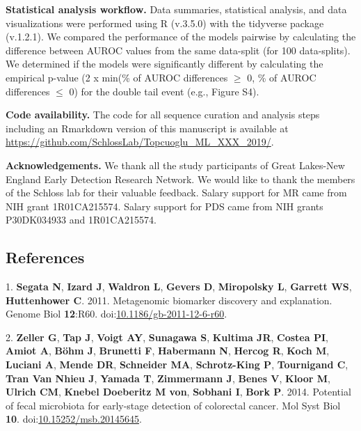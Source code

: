 \documentclass[11pt,]{article}
\begin{document}
\textbf{Statistical analysis workflow.} Data summaries, statistical
analysis, and data visualizations were performed using R (v.3.5.0) with
the tidyverse package (v.1.2.1). We compared the performance of the
models pairwise by calculating the difference between AUROC values from
the same data-split (for 100 data-splits). We determined if the models
were significantly different by calculating the empirical p-value (2 x
min(\% of AUROC differences \(\geq\) 0, \% of AUROC differences \(\leq\)
0) for the double tail event (e.g., Figure S4).

\textbf{Code availability.} The code for all sequence curation and
analysis steps including an Rmarkdown version of this manuscript is
available at \url{https://github.com/SchlossLab/Topcuoglu_ML_XXX_2019/}.

\textbf{Acknowledgements.} We thank all the study participants of Great
Lakes-New England Early Detection Research Network. We would like to
thank the members of the Schloss lab for their valuable feedback. Salary
support for MR came from NIH grant 1R01CA215574. Salary support for PDS
came from NIH grants P30DK034933 and 1R01CA215574.

\newpage

\subsection{References}\label{references}

\hypertarget{refs}{}
\hypertarget{ref-segata_metagenomic_2011}{}
1. \textbf{Segata N}, \textbf{Izard J}, \textbf{Waldron L},
\textbf{Gevers D}, \textbf{Miropolsky L}, \textbf{Garrett WS},
\textbf{Huttenhower C}. 2011. Metagenomic biomarker discovery and
explanation. Genome Biol \textbf{12}:R60.
doi:\href{https://doi.org/10.1186/gb-2011-12-6-r60}{10.1186/gb-2011-12-6-r60}.

\hypertarget{ref-zeller_potential_2014}{}
2. \textbf{Zeller G}, \textbf{Tap J}, \textbf{Voigt AY},
\textbf{Sunagawa S}, \textbf{Kultima JR}, \textbf{Costea PI},
\textbf{Amiot A}, \textbf{Böhm J}, \textbf{Brunetti F},
\textbf{Habermann N}, \textbf{Hercog R}, \textbf{Koch M},
\textbf{Luciani A}, \textbf{Mende DR}, \textbf{Schneider MA},
\textbf{Schrotz-King P}, \textbf{Tournigand C}, \textbf{Tran Van Nhieu
J}, \textbf{Yamada T}, \textbf{Zimmermann J}, \textbf{Benes V},
\textbf{Kloor M}, \textbf{Ulrich CM}, \textbf{Knebel Doeberitz M von},
\textbf{Sobhani I}, \textbf{Bork P}. 2014. Potential of fecal microbiota
for early-stage detection of colorectal cancer. Mol Syst Biol
\textbf{10}.
doi:\href{https://doi.org/10.15252/msb.20145645}{10.15252/msb.20145645}.
\end{document}
